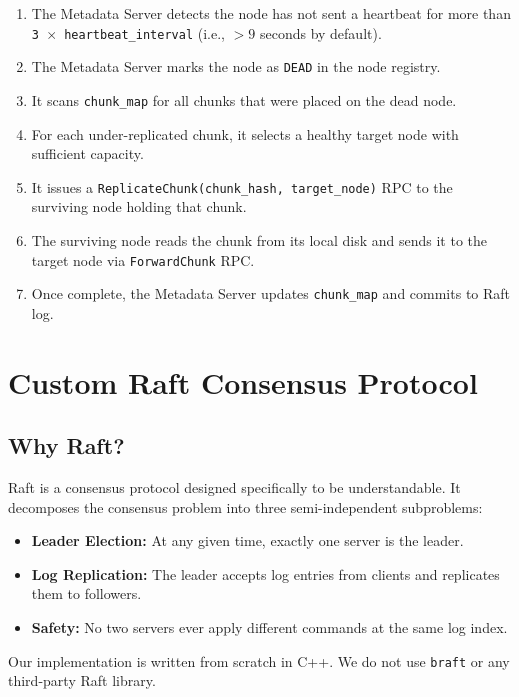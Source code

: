 \documentclass[12pt,a4paper]{article}
\begin{document}
\begin{enumerate}[leftmargin=2em]
  \item The Metadata Server detects the node has not sent a heartbeat for more than \texttt{3 $\times$ heartbeat\_interval} (i.e., $> 9$ seconds by default).
  \item The Metadata Server marks the node as \texttt{DEAD} in the node registry.
  \item It scans \texttt{chunk\_map} for all chunks that were placed on the dead node.
  \item For each under-replicated chunk, it selects a healthy target node with sufficient capacity.
  \item It issues a \texttt{ReplicateChunk(chunk\_hash, target\_node)} RPC to the surviving node holding that chunk.
  \item The surviving node reads the chunk from its local disk and sends it to the target node via \texttt{ForwardChunk} RPC.
  \item Once complete, the Metadata Server updates \texttt{chunk\_map} and commits to Raft log.
\end{enumerate}

\section{Custom Raft Consensus Protocol}

\subsection{Why Raft?}

Raft is a consensus protocol designed specifically to be understandable. It decomposes the consensus problem into three semi-independent subproblems:

\begin{itemize}[leftmargin=2em]
  \item \textbf{Leader Election:} At any given time, exactly one server is the leader.
  \item \textbf{Log Replication:} The leader accepts log entries from clients and replicates them to followers.
  \item \textbf{Safety:} No two servers ever apply different commands at the same log index.
\end{itemize}

Our implementation is written from scratch in C++. We do not use \texttt{braft} or any third-party Raft library.
\end{document}
